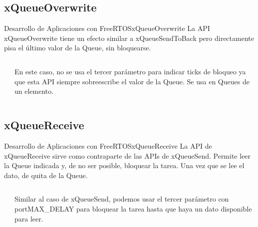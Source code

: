 \documentclass[aspectratio=169, xcolor=dvipsnames]{beamer}
\begin{document}
\subsection{xQueueOverwrite}
\begin{frame}{Desarrollo de Aplicaciones con FreeRTOS}{xQueueOverwrite}
La API \textcolor{myblue}{xQueueOverwrite} tiene un efecto similar a xQueueSendToBack pero directamente pisa el último valor de la Queue, sin bloquearse.\newline
\begin{columns}
\begin{column}{0.5\textwidth}

\end{column}
\begin{column}{0.5\textwidth}
\newline
En este caso, no se usa el tercer parámetro para indicar ticks de bloqueo ya que esta API siempre sobreescribe el valor de la Queue. Se usa en Queues de un elemento.
\end{column}
\end{columns}
\end{frame}

\subsection{xQueueReceive}
\begin{frame}{Desarrollo de Aplicaciones con FreeRTOS}{xQueueReceive}
La API de \textcolor{myblue}{xQueueReceive} sirve como contraparte de las APIs de xQueueSend. Permite leer la Queue indicada y, de no ser posible, bloquear la tarea. Una vez que se lee el dato, de quita de la Queue.\newline
\begin{columns}
\begin{column}{0.5\textwidth}

\end{column}
\begin{column}{0.5\textwidth}
Similar al caso de xQueueSend, podemos usar el tercer parámetro con \textcolor{myblue}{portMAX\_DELAY} para bloquear la tarea hasta que haya un dato disponible para leer.
\end{column}
\end{columns}
\end{frame}
\end{document}
